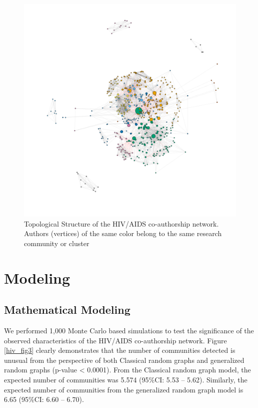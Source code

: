 \begin{figure}[h!]
\centering
\hspace{-1.5cm}
\includegraphics[scale=0.45]{Chapters/hiv/hivaids_net}
\caption{Topological Structure of the HIV/AIDS co-authorship network. Authors (vertices) of the same color belong to the same research community or cluster}
\label{hiv_fig5}
\end{figure}

\section{Modeling}
\subsection{Mathematical Modeling}
We performed 1,000 Monte Carlo based simulations to test the significance of the observed characteristics of the HIV/AIDS co-authorship network. Figure \ref{hiv_fig3} clearly demonstrates that the number of communities detected is unusual from the perspective of both Classical random graphs and generalized random graphs (p-value < 0.0001). From the Classical random graph model, the expected number of communities was 5.574 (95\%CI: 5.53 -- 5.62). Similarly, the expected number of communities from the generalized random graph model is 6.65 (95\%CI: 6.60 -- 6.70).

